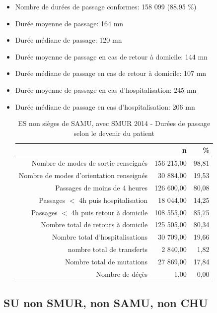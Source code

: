 \documentclass[]{article}
\begin{document}
\begin{itemize}
\itemsep1pt\parskip0pt
\item
  Nombre de durées de passage conformes: 158 099 (88.95 \%)
\item
  Durée moyenne de passage: 164 mn
\item
  Durée médiane de passage: 120 mn
\item
  Durée moyenne de passage en cas de retour à domicile: 144 mn
\item
  Durée médiane de passage en cas de retour à domicile: 107 mn
\item
  Durée moyenne de passage en cas d'hospitalisation: 245 mn
\item
  Durée médiane de passage en cas d'hospitalisation: 206 mn

  \begin{table}[ht]
  \centering
  \begin{tabular}{rrr}
    \hline
   & n & \% \\ 
    \hline
  Nombre de modes de sortie renseignés & 156 215,00 & 98,81 \\ 
    Nombre de modes d'orientation renseignés & 30 884,00 & 19,53 \\ 
    Passages de moins de 4 heures & 126 600,00 & 80,08 \\ 
    Passages $<$ 4h puis hospitalisation & 18 044,00 & 14,25 \\ 
    Passages $<$ 4h puis retour à domicile & 108 555,00 & 85,75 \\ 
    Nombre total de retours à domicile & 125 505,00 & 80,34 \\ 
    Nombre total d'hospitalisations & 30 709,00 & 19,66 \\ 
    nombre total de transferts & 2 840,00 & 1,82 \\ 
    Nombre total de mutations & 27 869,00 & 17,84 \\ 
    Nombre de déçès & 1,00 & 0,00 \\ 
     \hline
  \end{tabular}
  \caption{ES non sièges de SAMU, avec SMUR 2014 - Durées de passage selon le devenir du patient} 
  \end{table}
\end{itemize}

\subsection{SU non SMUR, non SAMU, non
CHU}\label{su-non-smur-non-samu-non-chu}
\end{document}
